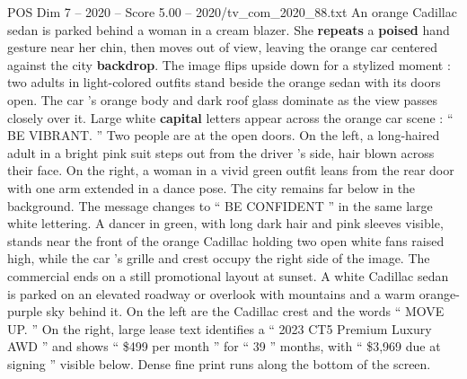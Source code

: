 \begin{textsample}{POS Dim 7 – 2020 – Score 5.00 – 2020/tv\_com\_2020\_88.txt}
An orange Cadillac sedan is parked behind a woman in a cream blazer.
She \textbf{repeats} a \textbf{poised} hand gesture near her chin, then moves out of view, leaving the orange car centered against the city \textbf{backdrop}.
The image flips upside down for a stylized moment : two adults in light-colored outfits stand beside the orange sedan with its doors open.
The car ’s orange body and dark roof glass dominate as the view passes closely over it.
Large white \textbf{capital} letters appear across the orange car scene : “ BE VIBRANT. ” Two people are at the open doors.
On the left, a long-haired adult in a bright pink suit steps out from the driver ’s side, hair blown across their face.
On the right, a woman in a vivid green outfit leans from the rear door with one arm extended in a dance pose.
The city remains far below in the background.
The message changes to “ BE CONFIDENT ” in the same large white lettering.
A dancer in green, with long dark hair and pink sleeves visible, stands near the front of the orange Cadillac holding two open white fans raised high, while the car ’s grille and crest occupy the right side of the image.
The commercial ends on a still promotional layout at sunset.
A white Cadillac sedan is parked on an elevated roadway or overlook with mountains and a warm orange-purple sky behind it.
On the left are the Cadillac crest and the words “ MOVE UP. ” On the right, large lease text identifies a “ 2023 CT5 Premium Luxury AWD ” and shows “ \$499 per month ” for “ 39 ” months, with “ \$3,969 due at signing ” visible below.
Dense fine print runs along the bottom of the screen.

\end{textsample}
